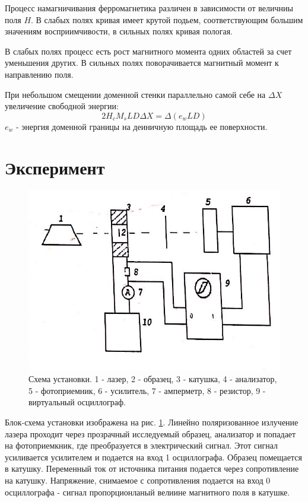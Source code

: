 \documentclass[a4paper]{article}
\begin{document}
Процесс намагничивания ферромагнетика различен в зависимости от величниы поля $H$. В слабых полях кривая имеет крутой подьем, соответствующим большим значениям восприимчивости, в сильных полях  кривая пологая. \par  
В слабых полях процесс есть рост магнитного момента одних областей за счет уменьшения других. В сильных полях поворачивается магнитный момент к направлению поля. \par 

При небольшом смещении доменной стенки параллельно самой себе на $\Delta X$ увеличение свободной энергии: 
$$2 H_c M_s L D \Delta X = \Delta(e_wLD)$$
$e_w$ - энергия доменной границы на деиничную площадь ее поверхности. 



\section{Эксперимент}

\begin{figure}[H]
    \begin{center}
        \includegraphics[scale=0.3]{setup.jpg}
        \caption{Схема установки. 1 - лазер, 2 - образец, 3 - катушка, 4 - анализатор, 5 - фотоприемник, 6 - усилитель, 7 - амперметр, 8 - резистор, 9 - виртуальный осциллограф.}
        \label{setup}
    \end{center}
\end{figure}

Блок-схема установки изображена на рис. \ref{setup}. Линейно поляризованное излучение лазера проходит через прозрачный исследуемый образец, анализатор и попадает на фотоприемкник, 
где преобразуется в электрический сигнал. Этот сигнал усиливается усилителем и подается на вход 1 осциллографа. Образец помещается в катушку. Переменный ток от источника питания подается через сопротивление на катушку. 
Напряжение, снимаемое с сопротивления подается на вход 0 осциллографа - сигнал пропорционланый велиине магнитного поля в катушке. \par 
\end{document}
